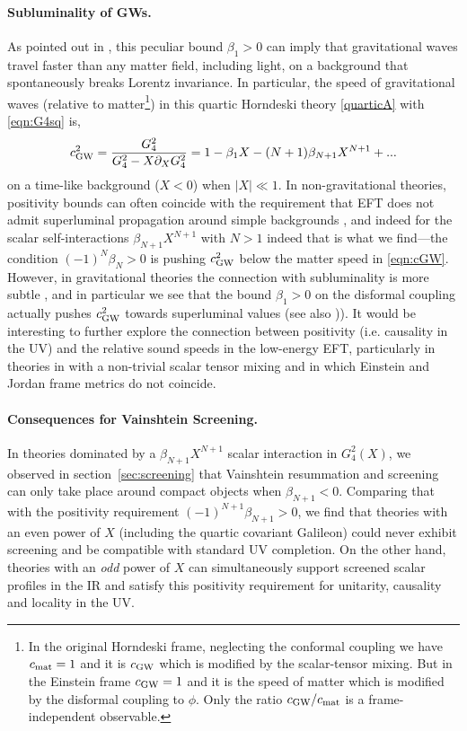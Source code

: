 \documentclass[11pt]{article}
\begin{document}
\paragraph{Subluminality of GWs.}
As pointed out in \cite{deRham:2021fpu}, this peculiar bound $\beta_1 > 0$ can imply that gravitational waves travel faster than any matter field, including light, on a background that spontaneously breaks Lorentz invariance. In particular, the speed of gravitational waves (relative to matter\footnote{
In the original Horndeski frame, neglecting the conformal coupling we have $c_{\rm mat} = 1$ and it is $c_{\rm GW}$ which is modified by the scalar-tensor mixing. But in the Einstein frame $c_{\rm GW} = 1$ and it is the speed of matter which is modified by the disformal coupling to $\phi$. Only the ratio $c_{\rm GW}/c_{\rm mat}$ is a frame-independent observable. 
}) in this quartic Horndeski theory \eqref{quarticA} with \eqref{eqn:G4sq} is,
\begin{align}
 c_{\rm GW}^2 = \frac{G_4^2}{G_4^2 -  X \partial_X G_{4}^2 }  =  1 - \beta_1 X  - (N+1) \beta_{N+1} X^{N+1}  + ... 
 \label{eqn:cGW}
\end{align}
on a time-like background ($X < 0$) when $|X| \ll 1$. 
In non-gravitational theories, positivity bounds can often coincide with the requirement that EFT does not admit superluminal propagation around simple backgrounds \cite{Adams:2006sv}, and indeed for the scalar self-interactions $\beta_{N+1} X^{N+1}$ with $N>1$ indeed that is what we find---the condition $(-1)^N \beta_N > 0$ is pushing $c_{\rm GW}^2$ below the matter speed in \eqref{eqn:cGW}. 
However, in gravitational theories the connection with subluminality is more subtle \cite{deRham:2019ctd, deRham:2021fpu}, and in particular we see that the bound $\beta_1 > 0$ on the disformal coupling actually pushes $c_{\rm GW}^2$ towards superluminal values (see also \cite{Shore:2007um, Babichev:2007dw})). 
It would be interesting to further explore the connection between positivity (i.e. causality in the UV) and the relative sound speeds in the low-energy EFT, particularly in theories in with a non-trivial scalar tensor mixing and in which Einstein and Jordan frame metrics do not coincide.


\paragraph{Consequences for Vainshtein Screening.}
In theories dominated by a $\beta_{N+1} X^{N+1}$ scalar interaction in $G_4^2(X)$, we observed in section~\ref{sec:screening} that Vainshtein resummation and screening can only take place around compact objects when $\beta_{N+1} < 0$. 
Comparing that with the positivity requirement $(-1)^{N+1} \beta_{N+1} > 0$, we find that theories with an even power of $X$ (including the quartic covariant Galileon) could never exhibit screening and be compatible with standard UV completion. On the other hand, theories with an \emph{odd} power of $X$ can simultaneously support screened scalar profiles in the IR and satisfy this positivity requirement for unitarity, causality and locality in the UV.
\end{document}
